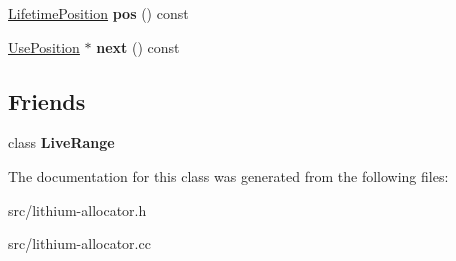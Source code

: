 \begin{DoxyCompactItemize}
\item 
\hypertarget{classv8_1_1internal_1_1_use_position_a0deec9e990d82cd40149d2d680ae592b}{}\hyperlink{classv8_1_1internal_1_1_lifetime_position}{Lifetime\+Position} {\bfseries pos} () const \label{classv8_1_1internal_1_1_use_position_a0deec9e990d82cd40149d2d680ae592b}

\item 
\hypertarget{classv8_1_1internal_1_1_use_position_a564926fb1742aec1110a4aad1012984f}{}\hyperlink{classv8_1_1internal_1_1_use_position}{Use\+Position} $\ast$ {\bfseries next} () const \label{classv8_1_1internal_1_1_use_position_a564926fb1742aec1110a4aad1012984f}

\end{DoxyCompactItemize}
\subsection*{Friends}
\begin{DoxyCompactItemize}
\item 
\hypertarget{classv8_1_1internal_1_1_use_position_a05b53ec81357069e15d5d0e582589f6a}{}class {\bfseries Live\+Range}\label{classv8_1_1internal_1_1_use_position_a05b53ec81357069e15d5d0e582589f6a}

\end{DoxyCompactItemize}


The documentation for this class was generated from the following files\+:\begin{DoxyCompactItemize}
\item 
src/lithium-\/allocator.\+h\item 
src/lithium-\/allocator.\+cc\end{DoxyCompactItemize}
